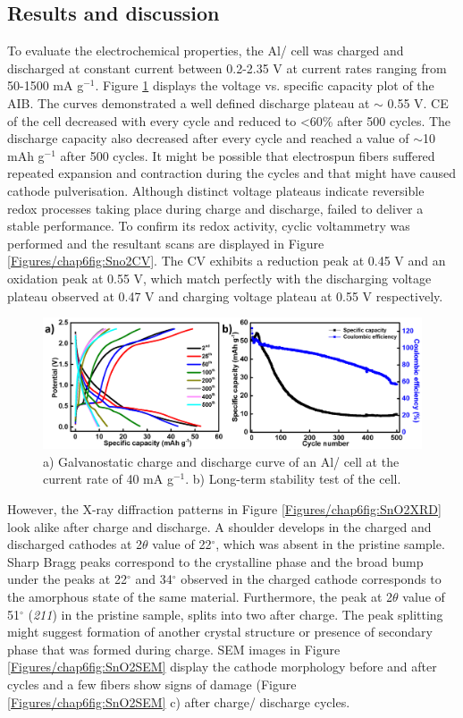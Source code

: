 \subsection{Results and discussion}
To evaluate the electrochemical properties, the Al/ cell was charged and discharged at constant current between 0.2-2.35 V at current rates ranging from 50-1500 mA g$^{-1}$. Figure \ref{Figures/chap6fig:SnO2newCDC} displays the voltage vs. specific capacity plot of the AIB. The curves demonstrated a well defined discharge plateau at $\sim$ 0.55 V. CE of the cell decreased with every cycle and reduced to <60\% after 500 cycles. The discharge capacity also decreased after every cycle and reached a value of $\sim$10 mAh g$^{-1}$ after 500 cycles. It might be possible that electrospun fibers suffered repeated expansion and contraction during the cycles and that might have caused cathode pulverisation. Although distinct voltage plateaus indicate reversible redox processes taking place during charge and discharge,  failed to deliver a stable performance. To confirm its redox activity, cyclic voltammetry was performed and the resultant scans are displayed in Figure \ref{Figures/chap6fig:Sno2CV}. The CV exhibits a reduction peak at 0.45 V and an oxidation peak at 0.55 V, which match perfectly with the discharging voltage plateau observed at 0.47 V and charging voltage plateau at 0.55 V respectively.    
\begin{figure}[th!]
  \centering
  \includegraphics[width=\textwidth]{Figures/chap6fig/SnO2newCDC}
    \caption{a) Galvanostatic charge and discharge curve of an Al/ cell at the current rate of 40 mA g$^{-1}$. b) Long-term stability test of the cell.}
  \label{Figures/chap6fig:SnO2newCDC}
\end{figure}
However, the X-ray diffraction patterns in Figure \ref{Figures/chap6fig:SnO2XRD} look alike after charge and discharge. A shoulder develops in the charged and discharged cathodes at 2$\theta$ value of 22$^{\circ}$, which was absent in the pristine sample. Sharp Bragg peaks correspond to the crystalline phase and the broad bump under the peaks at 22$^{\circ}$ and  34$^{\circ}$ observed in the charged cathode corresponds to the amorphous state of the same material. Furthermore, the peak at 2$\theta$ value of 51$^{\circ}$ (\textit{211}) in the pristine sample, splits into two after charge. The peak splitting might suggest formation of another crystal structure or presence of secondary phase that was formed during charge. SEM images in Figure \ref{Figures/chap6fig:SnO2SEM} display the cathode morphology before and after cycles and a few fibers show signs of damage (Figure \ref{Figures/chap6fig:SnO2SEM} c) after charge/ discharge cycles. 

